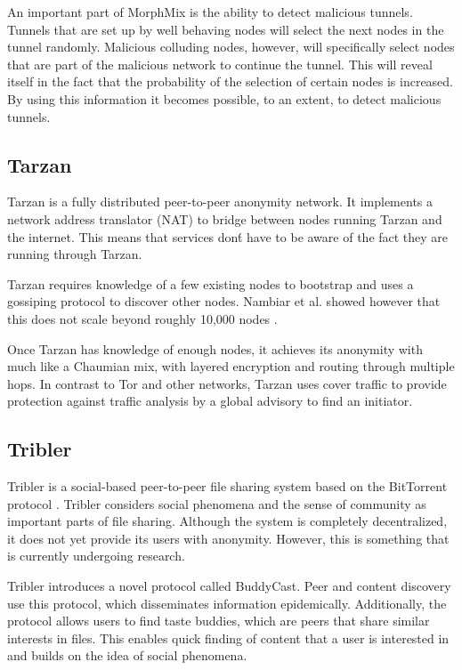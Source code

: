 \documentclass{article}
\begin{document}
		An important part of MorphMix is the ability to detect malicious tunnels. Tunnels that are set up by well behaving nodes will select the next nodes in the tunnel randomly. Malicious colluding nodes, however, will specifically select nodes that are part of the malicious network to continue the tunnel. This will reveal itself in the fact that the probability of the selection of certain nodes is increased. By using this information it becomes possible, to an extent, to detect malicious tunnels.
		
	\subsection{Tarzan} %
		Tarzan \cite{freedman2002tarzan} is a fully distributed peer-to-peer anonymity network. It implements a network address translator (NAT) to bridge between nodes running Tarzan and the internet. This means that services don\'t have to be aware of the fact they are running through Tarzan.
		
		Tarzan requires knowledge of a few existing nodes to bootstrap and uses a gossiping protocol to discover other nodes. Nambiar et al. showed however that this does not scale beyond roughly 10,000 nodes \cite{panchenko2009nisan, nambiar2006salsa}.
		
		Once Tarzan has knowledge of enough nodes, it achieves its anonymity with much like a Chaumian mix, with layered encryption and routing through multiple hops. In contrast to Tor and other networks, Tarzan uses cover traffic to provide protection against traffic analysis by a global advisory to find an initiator.
		
	\subsection{Tribler} %
		Tribler is a social-based peer-to-peer file sharing system based on the BitTorrent protocol \cite{pouwelse2008tribler}. Tribler considers social phenomena and the sense of community as important parts of file sharing. Although the system is completely decentralized, it does not yet provide its users with anonymity. However, this is something that is currently undergoing research.
		
		Tribler introduces a novel protocol called BuddyCast. Peer and content discovery use this protocol, which disseminates information epidemically. Additionally, the protocol allows users to find taste buddies, which are peers that share similar interests in files. This enables quick finding of content that a user is interested in and builds on the idea of social phenomena.
		
\end{document}
